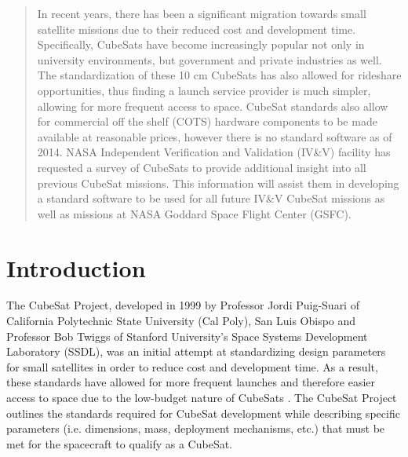 \documentclass[11pt]{article}
\begin{document}
\maketitle

\begin{abstract}
In recent years, there has been a significant migration towards small satellite missions due to their reduced cost and development time.  Specifically, CubeSats have become increasingly popular not only in university environments, but government and private industries as well.  The standardization of these 10 cm CubeSats has also allowed for rideshare opportunities, thus finding a launch service provider is much simpler, allowing for more frequent access to space.  CubeSat standards also allow for commercial off the shelf (COTS) hardware components to be made available at reasonable prices, however there is no standard software as of 2014.  NASA Independent Verification and Validation (IV\&V) facility has requested a survey of CubeSats to provide additional insight into all previous CubeSat missions.  This information will assist them in developing a standard software to be used for all future IV\&V CubeSat missions as well as missions at NASA Goddard Space Flight Center (GSFC).

\end{abstract}

\section{Introduction}
The CubeSat Project, developed in 1999 by Professor Jordi Puig-Suari of California Polytechnic State University (Cal Poly), San Luis Obispo and Professor Bob Twiggs of Stanford University's Space Systems Development Laboratory (SSDL), was an initial attempt at standardizing design parameters for small satellites in order to reduce cost and development time.  As a result, these standards have allowed for more frequent launches and therefore easier access to space due to the low-budget nature of CubeSats \cite{CalPoly}.  The CubeSat Project outlines the standards required for CubeSat development while describing specific parameters (i.e. dimensions, mass, deployment mechanisms, etc.) that must be met for the spacecraft to qualify as a CubeSat.
\end{document}
